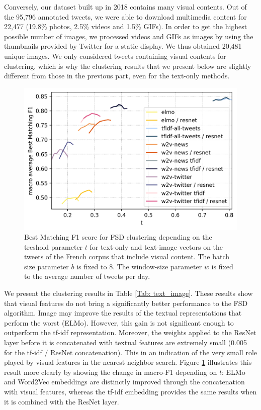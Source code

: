 Conversely, our dataset built up in 2018 contains many visual contents. Out of the 95,796 annotated tweets, we were able to download multimedia content for 22,477 (19.8\% photos, 2.5\% videos and 1.5\% GIFs). In order to get the highest possible number of images, we processed videos and GIFs as images by using the thumbnails provided by Twitter for a static display.  We thus obtained 20,481 unique images. We only considered tweets containing visual contents for clustering, which is why the clustering results that we present below are slightly different from those in the previous part, even for the text-only methods.


\begin{figure}[ht]
  \centering
  \includegraphics[width=.7\linewidth]{figures/text_image_clustering.png}
  \caption[Best Matching F1 score for FSD clustering depending on the treshold parameter $t$ for text-only and text-image vectors]{Best Matching F1 score for FSD clustering depending on the treshold parameter $t$ for text-only and text-image vectors on the tweets of the French corpus that include visual content. The batch size parameter $b$ is fixed to 8. The window-size parameter $w$ is fixed to the average number of tweets per day.}
  \label{Fig:text-image}
\end{figure}


We present the clustering results in Table \ref{Tab: text_image}. These results show that visual features do not bring a significantly better performance to the FSD algorithm. Image may improve the results of the textual representations that perform the worst (ELMo). However, this gain is not significant enough to outperform the tf-idf representation. Moreover, the weights applied to the ResNet layer before it is concatenated with textual features are extremely small (0.005 for the tf-idf / ResNet concatenation). This in an indication of the very small role played by visual features in the nearest neighbor search. Figure \ref{Fig:text-image} illustrates this result more clearly by showing the change in macro-F1 depending on $t$: ELMo and Word2Vec embeddings are distinctly improved through the concatenation with visual features, whereas the tf-idf embedding provides the same results when it is combined with the ResNet layer.

